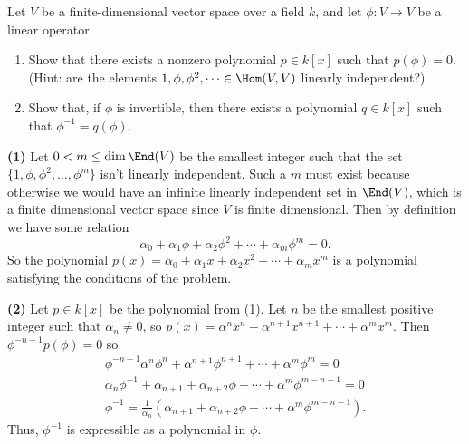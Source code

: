 \begin{problem}
Let $V$ be a finite-dimensional vector space over a field $k$, and let $\phi:V\to V$ be a linear operator. 
\begin{enumerate}
  \item Show that there exists a nonzero polynomial $p\in k[x]$ such that $p(\phi)=0$. (Hint: are the elements $1,\phi,\phi^2,\dots\in \Hom(V,V)$ linearly independent?)
  \item Show that, if $\phi$ is invertible, then there exists a polynomial $q\in k[x]$ such that $\phi^{-1}=q(\phi)$.
\end{enumerate}
\end{problem}

\textbf{(1)} Let $0<m\leq \dim \End(V)$ be the smallest integer such that the set $\{ 1, \phi, \phi^2, \ldots , \phi^{m}\}$ isn't linearly independent. Such a $m$ must exist because otherwise we would have an infinite linearly independent set in $\End(V)$, which is a finite dimensional vector space since $V$ is finite dimensional. Then by definition we have some relation
\[
  \alpha_0+\alpha_1 \phi + \alpha_2 \phi^2 + \cdots + \alpha_{m}\phi^m=0
.\] 
So the polynomial $p(x)=\alpha_0+\alpha_1x+\alpha_2x^2+\cdots+\alpha_m x^m$ is a polynomial satisfying the conditions of the problem.

\textbf{(2)} Let $p\in k[x]$ be the polynomial from (1). Let $n$ be the smallest positive integer such that $\alpha_n\neq 0$, so $p(x)=\alpha^nx^n+\alpha^{n+1}x^{n+1}+\cdots+\alpha^mx^m$. Then $\phi^{-n-1}p(\phi)=0$ so
\[\begin{aligned}
  \phi^{-n-1}\alpha^n\phi^n+\alpha^{n+1}\phi^{n+1}+\cdots+\alpha^m\phi^m=0\\
  \alpha_n\phi^{-1}+\alpha_{n+1}+\alpha_{n+2}\phi+\cdots+\alpha^m\phi^{m-n-1}=0\\
  \phi^{-1}=\frac{1}{\alpha_n}\left(\alpha_{n+1}+\alpha_{n+2}\phi+\cdots+\alpha^m\phi^{m-n-1}\right).
\end{aligned}\]
Thus, $\phi^{-1}$ is expressible as a polynomial in $\phi$.  